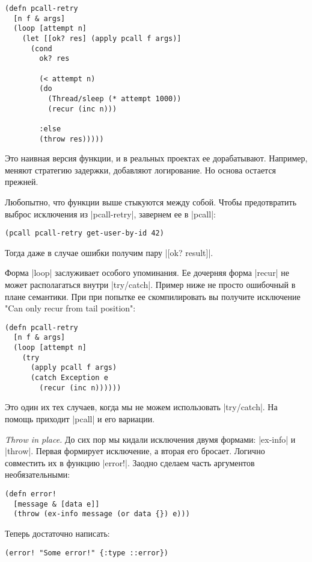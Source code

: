 \begin{verbatim}
(defn pcall-retry
  [n f & args]
  (loop [attempt n]
    (let [[ok? res] (apply pcall f args)]
      (cond
        ok? res

        (< attempt n)
        (do
          (Thread/sleep (* attempt 1000))
          (recur (inc n)))

        :else
        (throw res)))))
\end{verbatim}

Это наивная версия функции, и в реальных проектах ее дорабатывают. Например,
меняют стратегию задержки, добавляют логирование. Но основа остается прежней.

Любопытно, что функции выше стыкуются между собой. Чтобы предотвратить выброс
исключения из \spverb|pcall-retry|, завернем ее в \spverb|pcall|:

\begin{verbatim}
(pcall pcall-retry get-user-by-id 42)
\end{verbatim}

Тогда даже в случае ошибки получим пару \spverb|[ok? result]|.

Форма \spverb|loop| заслуживает особого упоминания. Ее дочерняя форма \spverb|recur| не может
располагаться внутри \spverb|try/catch|. Пример ниже не просто ошибочный в плане
семантики. При при попытке ее скомпилировать вы получите исключение "Can only
recur from tail position":

\begin{verbatim}
(defn pcall-retry
  [n f & args]
  (loop [attempt n]
    (try
      (apply pcall f args)
      (catch Exception e
        (recur (inc n))))))
\end{verbatim}

Это один их тех случаев, когда мы не можем использовать \spverb|try/catch|. На помощь
приходит \spverb|pcall| и его вариации.

\emph{Throw in place.} До сих пор мы кидали исключения двумя формами: \spverb|ex-info| и
\spverb|throw|. Первая формирует исключение, а вторая его бросает. Логично совместить
их в функцию \spverb|error!|. Заодно сделаем часть аргументов необязательными:

\begin{verbatim}
(defn error!
  [message & [data e]]
  (throw (ex-info message (or data {}) e)))
\end{verbatim}

Теперь достаточно написать:

\begin{verbatim}
(error! "Some error!" {:type ::error})
\end{verbatim}

